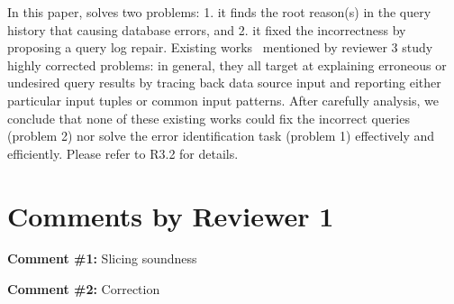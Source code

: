 In this paper, \sys solves two problems: 1. it finds the root reason(s) in the
query history that causing database errors, and 2. it fixed the incorrectness
by proposing a query log repair. Existing works~\cite{Wu13, roy2014formal,
chalamalla2014,meliou2011tracing} mentioned by reviewer 3 study highly
corrected problems: in general, they all target at explaining erroneous or
undesired query results by tracing back data source input and reporting either
particular input tuples or common input patterns. After carefully analysis, we
conclude that none of these existing works could fix the incorrect queries
(problem 2) nor solve the error identification task (problem 1) effectively
and efficiently. Please refer to R3.2 for details.



\section*{Comments by Reviewer 1}

\noindent
\textbf{Comment \#1:} Slicing soundness
\begin{quote}
\end{quote}



\comskip

\noindent
\textbf{Comment \#2:} Correction
\begin{quote}
\end{quote}

